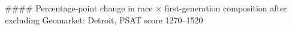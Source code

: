 #### Percentage-point change in race × first-generation composition after excluding Geomarket: Detroit, PSAT score 1270–1520
